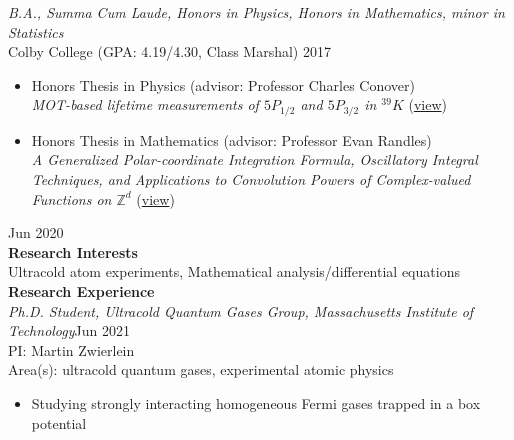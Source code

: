 \documentclass[10pt]{article}
\begin{document}
\noindent \textit{B.A., Summa Cum Laude, Honors in Physics, Honors in Mathematics, minor in Statistics}\\
Colby College (GPA: 4.19/4.30, Class Marshal) \hfill 2017\vspace{-2pt}

\begin{itemize}
	\setlength\itemsep{-1pt}
	\item Honors Thesis in Physics (advisor: Professor Charles Conover)\\
	\textit{MOT-based lifetime measurements of $5P_{1/2}$ and $5P_{3/2}$ in $^{39}K$} (\href{https://digitalcommons.colby.edu/honorstheses/1298/}{view})
	
	\item Honors Thesis in Mathematics (advisor: Professor Evan Randles)\\ 
	\indent \textit{A Generalized Polar-coordinate Integration Formula, Oscillatory Integral Techniques, and Applications to Convolution Powers of Complex-valued Functions on $\mathbb{Z}^d$} (\href{https://digitalcommons.colby.edu/honorstheses/1293/}{view})
\end{itemize}



\hfill  Jun 2020\\




\noindent \large{\textbf{{Research Interests}}}   \normalsize \\  
\noindent Ultracold atom experiments, Mathematical analysis/differential equations\\


\noindent \large{\textbf{{Research Experience}}}   \normalsize \\  
\noindent \textit{Ph.D. Student, Ultracold Quantum Gases Group, Massachusetts Institute of Technology}\hfill Jun 2021\textendash \\
PI: Martin Zwierlein\\
Area(s): ultracold quantum gases, experimental atomic physics \vspace{-5pt}
\begin{itemize}
	\setlength\itemsep{-4pt}
	\item Studying strongly interacting homogeneous Fermi gases trapped in a box potential 
\end{itemize}
\end{document}
